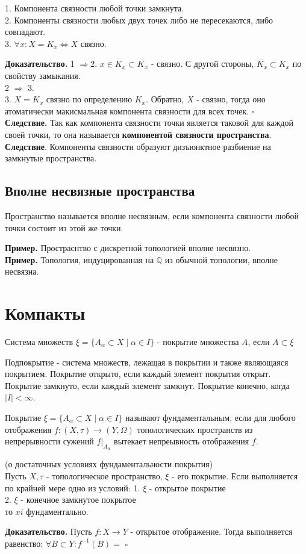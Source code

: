 \begin{theor}
1. Компонента связности любой точки замкнута.\\
2. Компоненты связности любых двух точек либо не пересекаются, либо 
совпадают.\\
3. $\forall x: X=K_x\iff X$ связно.
\end{theor}
\textbf{Доказательство.} 1 $\Rightarrow$2.
$x\in K_x\subset \overline{K_x}$ - связно.
С другой стороны, $\overline{K_x}\subset K_x$ по свойству замыкания.\\
2 $\Rightarrow$ 3. \\
3. $X=K_x$  связно по определению  $K_x$. Обратно,  $X$ - связно, тогда оно
атоматически макисмальная компонента связности для всех точек.
$\square$\\
\textbf{Следствие.} Так как компонента связности точки является таковой для
каждой своей точки, то она называется \textbf{компонентой связности 
пространства}.\\
\textbf{Следствие}. Компоненты связности образуют дизъюнктное разбиение
на замкнутые пространства. 
\subsection{Вполне несвязные пространства}
\begin{defin}
Пространство называется вполне несвязным, если компонента связности любой
точки состоит из этой же точки. 
\end{defin}
\textbf{Пример.} Простраснтво с дискретной топологией вполне несвязно.\\
\textbf{Пример.} Топология, индуцированная на $\mathbb{Q}$ из обычной 
топологии, вполне несвязна. 
\section{Компакты}
\begin{defin}
Система множеств $\xi=\{A_\alpha \subset X \mid \alpha\in I\}$ - покрытие
множества $A$, если  $A\subset \xi$
\end{defin}
Подпокрытие - система множеств, лежащая в покрытии и также являющаяся 
покрытием. 
Покрытие открыто, если каждый элемент покрытия открыт.
Покрытие замкнуто, если каждый элемент замкнут. 
Покрытие конечно, когда $|I|<\infty$. 
\begin{defin}
Покрытие $\xi=\{A_\alpha \subset X \mid \alpha\in I\}$ 
называют фундаментальным, если для любого отображения 
$f\colon  (X,\tau)\to (Y,\Omega)$
топологических пространств из непрерывности сужений $f|_{A_\alpha}$ 
вытекает непреывность отображения $f$.
\end{defin}
\begin{theor} (о достаточных условиях фундаментальности покрытия)\\
Пусть $X,\tau$ - топологическое пространство,  $\xi$ - его покрытие. 
Если выполняется по крайней мере одно из условий:
1. $\xi$ - открытое покрытие\\
2. $\xi$ - конечное замкнутое покрытое\\
то  $xi$ фундаментально.
\end{theor}
\textbf{Доказательство.} Пусть $f\colon X\to Y$ - открытое отображение. 
Тогда выполняется равенство: 
$\forall B\subset Y:f^{-1}(B)=$
$\square$ 
